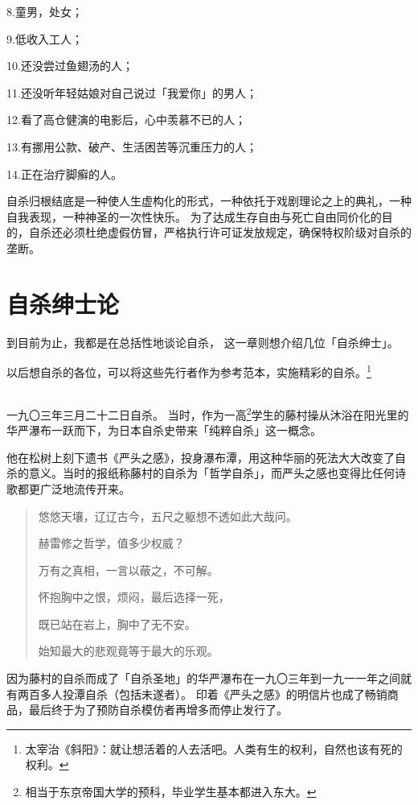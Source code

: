 \documentclass[UTF8]{ctexart}
\begin{document}
8.童男，处女；

9.低收入工人；

10.还没尝过鱼翅汤的人；

11.还没听年轻姑娘对自己说过「我爱你」的男人；

12.看了高仓健演的电影后，心中羡慕不已的人；

13.有挪用公款、破产、生活困苦等沉重压力的人；

14.正在治疗脚癣的人。

自杀归根结底是一种使人生虚构化的形式，一种依托于戏剧理论之上的典礼，一种自我表现，一种神圣的一次性快乐。
为了达成生存自由与死亡自由同价化的目的，自杀还必须杜绝虚假仿冒，严格执行许可证发放规定，确保特权阶级对自杀的垄断。

\section{自杀绅士论}

到目前为止，我都是在总括性地谈论自杀，
这一章则想介绍几位「自杀绅士」。

以后想自杀的各位，可以将这些先行者作为参考范本，实施精彩的自杀。\footnote{太宰治《斜阳》：就让想活着的人去活吧。人类有生的权利，自然也该有死的权利。}

\subsection{}
一九〇三年三月二十二日自杀。
当时，作为一高\footnote{相当于东京帝国大学的预科，毕业学生基本都进入东大。}学生的藤村操从沐浴在阳光里的华严瀑布一跃而下，为日本自杀史带来「纯粹自杀」这一概念。

他在松树上刻下遗书《严头之感》，投身瀑布潭，用这种华丽的死法大大改变了自杀的意义。当时的报纸称藤村的自杀为「哲学自杀」，而严头之感也变得比任何诗歌都更广泛地流传开来。

\begin{verse}
    悠悠天壤，辽辽古今，五尺之躯想不透如此大哉问。
    
    赫雷修之哲学，值多少权威？
    
    万有之真相，一言以蔽之，不可解。
    
    怀抱胸中之恨，烦闷，最后选择一死，
    
    既已站在岩上，胸中了无不安。
    
    始知最大的悲观竟等于最大的乐观。
\end{verse}

因为藤村的自杀而成了「自杀圣地」的华严瀑布在一九〇三年到一九一一年之间就有两百多人投潭自杀（包括未遂者）。
印着《严头之感》的明信片也成了畅销商品，最后终于为了预防自杀模仿者再增多而停止发行了。
\end{document}
